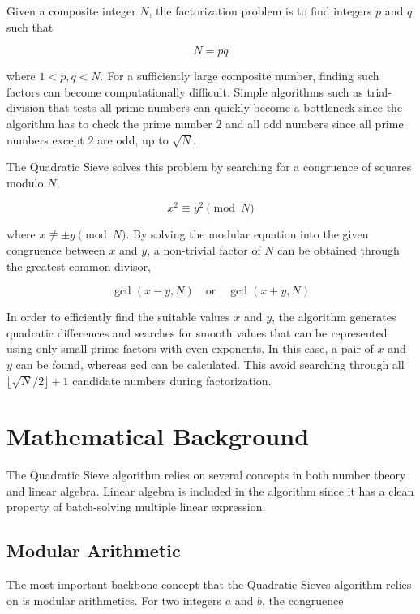 \documentclass[11pt,a4paper]{article}
\begin{document}
Given a composite integer $N$, the factorization problem is to find integers $p$ and $q$ such that

\[
N = pq
\]

where $1 < p,q < N$. For a sufficiently large composite number, finding such factors can become computationally difficult. Simple algorithms such as trial-division that tests all prime numbers can quickly become a bottleneck since the algorithm has to check the prime number $2$ and all odd numbers since all prime numbers except $2$ are odd, up to $\sqrt{N}$.

The Quadratic Sieve solves this problem by searching for a congruence of squares modulo $N$,

\[
x^2 \equiv y^2 \pmod{N}
\]

where $x \not\equiv \pm y \pmod{N}$. By solving the modular equation into the given congruence between $x$ and $y$, a non-trivial factor of $N$ can be obtained through the greatest common divisor,

\[
\gcd(x-y,N) \quad \text{or} \quad \gcd(x+y,N)
\]

In order to efficiently find the suitable values $x$ and $y$, the algorithm generates quadratic differences and searches for smooth values that can be represented using only small prime factors with even exponents. In this case, a pair of $x$ and $y$ can be found, whereas gcd can be calculated. This avoid searching through all $\lfloor \sqrt{N}/2 \rfloor + 1$ candidate numbers during factorization.

\section*{Mathematical Background}

The Quadratic Sieve algorithm relies on several concepts in both number theory and linear algebra. Linear algebra is included in the algorithm since it has a clean property of batch-solving multiple linear expression.

\subsection*{Modular Arithmetic}

The most important backbone concept that the Quadratic Sieves algorithm relies on is modular arithmetics. For two integers $a$ and $b$, the congruence 
\end{document}
